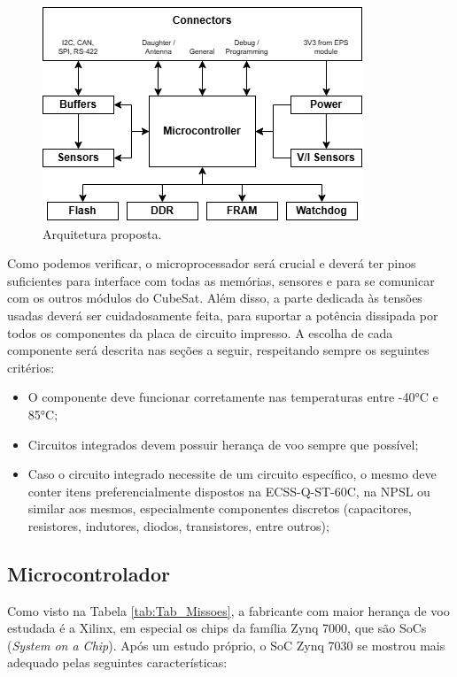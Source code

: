\begin{figure}[htp]
    \centering
    \includegraphics[scale=0.7]{images/arquitetura geral.png}
    \caption{Arquitetura proposta.}
    \label{fig:arq_geral}
\end{figure}

Como podemos verificar, o microprocessador será crucial e deverá ter pinos suficientes para interface com todas as memórias, sensores e para se comunicar com os outros módulos do CubeSat. Além disso, a parte dedicada às tensões usadas deverá ser cuidadosamente feita, para suportar a potência dissipada por todos os componentes da placa de circuito impresso. A escolha de cada componente será descrita nas seções a seguir, respeitando sempre os seguintes critérios:

\begin{itemize}
	\item O componente deve funcionar corretamente nas temperaturas entre -40°C e 85°C;
	\item Circuitos integrados devem possuir herança de voo sempre que possível;
	\item Caso o circuito integrado necessite de um circuito específico, o mesmo deve conter itens preferencialmente dispostos na ECSS-Q-ST-60C, na NPSL ou similar aos mesmos, especialmente componentes discretos (capacitores, resistores, indutores, diodos, transistores, entre outros);
\end{itemize}

\subsection{Microcontrolador}

Como visto na Tabela \ref{tab:Tab_Missoes}, a fabricante com maior herança de voo estudada é a Xilinx, em especial os chips da família Zynq 7000, que são SoCs (\textit{System on a Chip}). Após um estudo próprio, o SoC Zynq 7030 se mostrou mais adequado pelas seguintes características:

